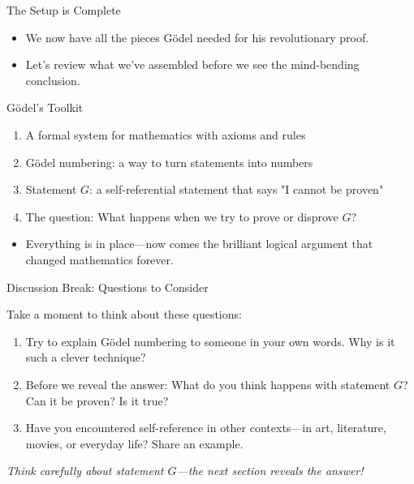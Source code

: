 \documentclass[aspectratio=169]{beamer}
\begin{document}
\begin{frame}{The Setup is Complete}

\begin{itemize}
    \item We now have all the pieces Gödel needed for his revolutionary proof.
    \item Let's review what we've assembled before we see the mind-bending conclusion.
\end{itemize}

\begin{block}{Gödel's Toolkit}
\begin{enumerate}
    \item A formal system for mathematics with axioms and rules
    \item Gödel numbering: a way to turn statements into numbers
    \item Statement $G$: a self-referential statement that says "I cannot be proven"
    \item The question: What happens when we try to prove or disprove $G$?
\end{enumerate}
\end{block}

\begin{itemize}
    \item Everything is in place—now comes the brilliant logical argument that changed mathematics forever.
\end{itemize}

\end{frame}

\begin{frame}{Discussion Break: Questions to Consider}

\begin{block}{Take a moment to think about these questions:}
\begin{enumerate}
    \item Try to explain Gödel numbering to someone in your own words. Why is it such a clever technique?
    \item Before we reveal the answer: What do you think happens with statement $G$? Can it be proven? Is it true?
    \item Have you encountered self-reference in other contexts—in art, literature, movies, or everyday life? Share an example.
\end{enumerate}
\end{block}

\vspace{0.5cm}
\begin{center}
\textit{Think carefully about statement $G$—the next section reveals the answer!}
\end{center}

\end{frame}
\end{document}
